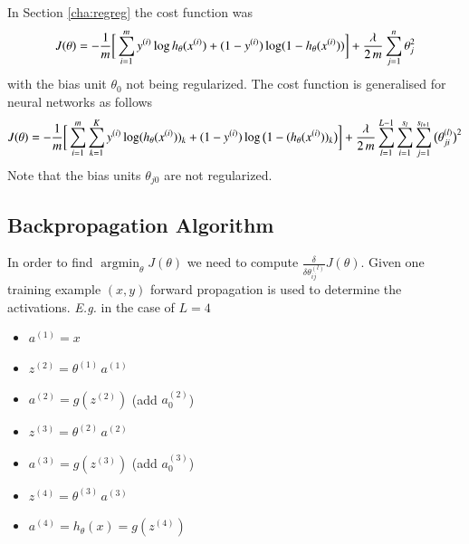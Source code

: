\documentclass[a4paper,twoside,10pt]{article}
\begin{document}
In Section \ref{cha:regreg} the cost function was
\begin{equation*}
  J(\theta)=-\frac{1}{m}\bigg[\displaystyle\sum_{i=1}^my^{(i)}\operatorname{log}h_\theta(x^{(i)})+(1-y^{(i)})\operatorname{log}(1-h_\theta(x^{(i)}))\bigg]+
  \frac{\lambda}{2\,m}\sum_{j=1}^n\theta_j^2
\end{equation*}
with the bias unit $\theta_0$ not being regularized. The cost function is generalised for neural networks as follows
\newcommand{\sumk}{\ensuremath{\displaystyle\sum_{k=1}^K}}
\newcommand{\suml}{\ensuremath{\displaystyle\sum_{l=1}^{L-1}}}
\begin{equation*}
  J(\theta)=-\frac{1}{m}\bigg[\sumi\sumk\syi\operatorname{log}(h_\theta(\sxi))_k+(1-\syi)\operatorname{log}\big(1-(h_\theta(\sxi))_k\big)\bigg]+
  \frac{\lambda}{2\,m}\suml\sum_{i=1}^{s_l}\sum_{j=1}^{s_{l+1}}\big(\theta^{(l)}_{ji}\big)^2
\end{equation*}
Note that the bias units $\theta_{j0}$ are not regularized.

\subsection{Backpropagation Algorithm}
In order to find $\mathop{\operatorname{argmin}}_\theta J(\theta)$ we need to compute $\frac{\delta}{\delta\theta^{(l)}_{ij}}J(\theta)$.
Given one training example $(x,y)$ forward propagation is used to determine the activations.
\emph{E.g.} in the case of $L=4$
\begin{itemize}
  \item $a^{(1)}=x$
  \item $z^{(2)}=\theta^{(1)}\,a^{(1)}$
  \item $a^{(2)}=g(z^{(2)})$ (add $a^{(2)}_0$)
  \item $z^{(3)}=\theta^{(2)}\,a^{(2)}$
  \item $a^{(3)}=g(z^{(3)})$ (add $a^{(3)}_0$)
  \item $z^{(4)}=\theta^{(3)}\,a^{(3)}$
  \item $a^{(4)}=h_\theta(x)=g(z^{(4)})$
\end{itemize}
\end{document}
